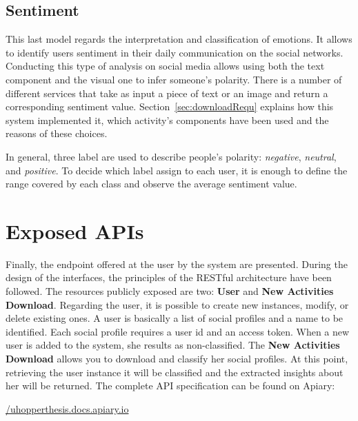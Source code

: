 \subsection{Sentiment}
This last model regards the interpretation and classification of emotions.
It allows to identify users sentiment in their daily communication on the social networks.
Conducting this type of analysis on social media allows using both the text component and the visual one to infer someone's polarity.
There is a number of different services that take as input a piece of text or an image and return a corresponding sentiment value.
Section~\ref{sec:downloadRequ} explains how this system implemented it, which activity's components have been used and the reasons of these choices.

In general, three label are used to describe people's polarity: \textit{negative}, \textit{neutral}, and \textit{positive}.
To decide which label assign to each user, it is enough to define the range covered by each class and observe the average sentiment value. 
\section{Exposed APIs}
Finally, the endpoint offered at the user by the system are presented. During the design of the interfaces, the principles of the RESTful architecture have been followed.
The resources publicly exposed are two: \textbf{User} and \textbf{New Activities Download}.
Regarding the user, it is possible to create new instances, modify, or delete existing ones.
A user is basically a list of social profiles and a name to be identified. Each social profile requires a user id and an access token.
When a new user is added to the system, she results as non-classified. The \textbf{New Activities Download} allows you to download and classify her social profiles.
At this point, retrieving the user instance it will be classified and the extracted insights about her will be returned.
The complete API specification can be found on Apiary:

\begin{center}
\url{/uhopperthesis.docs.apiary.io}
\end{center}
